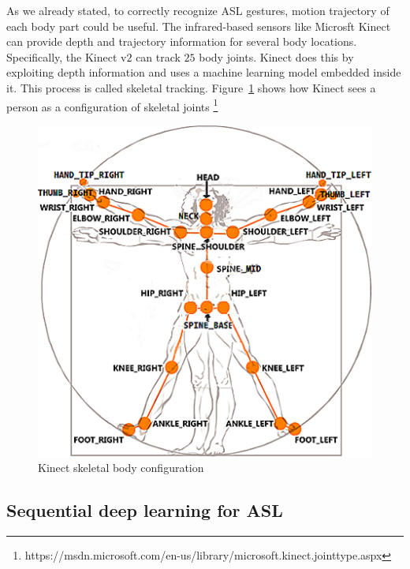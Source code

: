 \documentclass[10pt,twocolumn,letterpaper]{article}
\begin{document}
As we already stated, to correctly recognize ASL gestures, motion trajectory of each body part could be useful. The infrared-based sensors like 
Microsft Kinect can provide depth and trajectory information 
for several body locations. 
Specifically, the Kinect v$2$ can 
track $25$ body joints. Kinect does this by exploiting 
depth information and uses 
a machine learning model embedded inside it. 
%
This process is called skeletal tracking. Figure~\ref{fig:kinect_sk} shows
how Kinect sees a person as a configuration of skeletal 
joints \footnote{https://msdn.microsoft.com/en-us/library/microsoft.kinect.jointtype.aspx} 
\begin{figure}[h]
	\begin{center}
		\includegraphics[width=.8\linewidth]{kinect_sk}
	\end{center}
	\caption{Kinect skeletal body configuration}
	\label{fig:kinect_sk}
\end{figure}



\subsection{Sequential deep learning for ASL}
\end{document}
